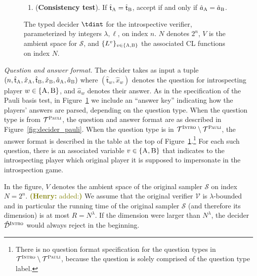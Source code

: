 \documentclass[11pt]{article}
\theoremstyle{definition}
\newcommand{\sampler}{\mathcal{S}}
\newcommand{\decider}{\mathcal{D}}
\newcommand{\verifier}{\mathcal{V}}
\newcommand{\type}{\mathcal{T}}
\newcommand{\gamestyle}[1]{\ensuremath{\textsc{#1}}\xspace}
\newcommand{\pauli}{\gamestyle{Pauli}}
\newcommand{\intro}{\gamestyle{Intro}}
\newcommand{\labelstyle}[1]{\ensuremath{\textsc{#1}}\xspace}
\newcommand{\tvarstyle}[1]{\mathsf{#1}}
\newcommand{\tvar}{\ensuremath{\tvarstyle{t}}}
\newcommand{\trole}{\ensuremath{v}}
\newcommand{\alice}{\labelstyle{A}}
\newcommand{\bob}{\labelstyle{B}}
\newcommand{\AB}{\{\alice, \bob\}}
\newenvironment{gamespec}{
  \begin{mdframed}[style=figstyle]}{
  \end{mdframed}}
\newcommand{\hnote}[1]{\textcolor{olive}{\small {\textbf{(Henry:} #1\textbf{) }}}}
\newcommand{\hnote}[1]{}
\begin{document}
\begin{figure}[!htbp]
\begin{gamespec}
\begin{enumerate}[itemsep=2pt, parsep=2pt]
    \item (\textbf{Consistency test}).
      \label{enu:intro-consistency}
      If $\hat{\tvar}_\alice = \hat{\tvar}_\bob$, accept if and only if
      $\hat{a}_\alice = \hat{a}_\bob$.
    \end{enumerate}
  \end{gamespec}
  \caption{The typed decider $\tdint$ for the introspective verifier,
    parameterized by integers $\lambda, \ell$, on index $n$.
    $N$ denotes $2^n$, $V$ is the ambient space for $\sampler$, and
    $\{L^\trole\}_{\trole\in\{\alice,\bob\}}$ the associated CL functions on
    index $N$.}
  \label{fig:intro-decider}
\end{figure}

\medskip
\emph{Question and answer format.}
The decider takes as input a tuple $(n, \hat{\tvar}_\alice, \hat{x}_\alice,
\hat{\tvar}_\bob, \hat{x}_\bob, \hat{a}_\alice, \hat{a}_\bob)$ where
$(\hat{\tvar}_w,\hat{x}_w)$ denotes the question for introspecting player $w \in
\AB$, and $\hat{a}_w$ denotes their answer.
As in the specification of the Pauli basis test, in
Figure~\ref{fig:intro-decider} we include an ``answer key'' indicating how the
players' answers are parsed, depending on the question type.
When the question type is from $\type^\pauli$, the question and answer format
are as described in Figure~\ref{fig:decider_pauli}.
When the question type is in $\type^\intro \setminus \type^\pauli$, the answer
format is described in the table at the top of
Figure~\ref{fig:intro-decider}.\footnote{There is no question format
  specification for the question types in $\type^\intro \setminus \type^\pauli$,
  because the question is solely comprised of the question type label.}
For each such question, there is an associated variable $\trole \in \AB$ that
indicates to the introspecting player which {original player} it is supposed to
impersonate in the introspection game.

In the figure, $V$ denotes the ambient space of the original sampler $\sampler$
on index $N = 2^n$. \hnote{added:} We assume that the original verifier $\verifier$ is $\lambda$-bounded and in particular the running time of the original sampler $\sampler$ (and therefore its dimension) is at most $R = N^\lambda$. If the dimension were larger than $N^\lambda$, the decider $\hat{\decider}^\intro$ would always reject in the beginning. 
\end{document}
